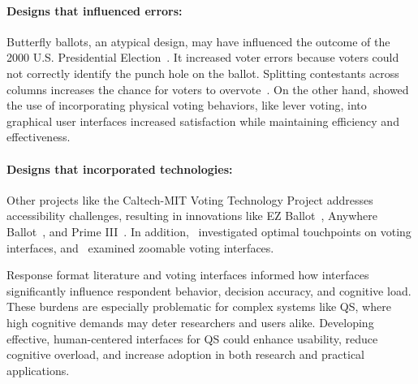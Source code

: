 \paragraph{Designs that influenced errors: } Butterfly ballots, an atypical design, may have influenced the outcome of the 2000 U.S. Presidential Election~\cite{wandButterflyDidIt2001}. It increased voter errors because voters could not correctly identify the punch hole on the ballot. Splitting contestants across columns increases the chance for voters to overvote~\cite{quesenberyOpinionGoodDesign2020}. On the other hand, \citet{everettElectronicVotingMachines2008} showed the use of incorporating physical voting behaviors, like lever voting, into graphical user interfaces increased satisfaction while maintaining efficiency and effectiveness.

\paragraph{Designs that incorporated technologies: } Other projects like the Caltech-MIT Voting Technology Project addresses accessibility challenges, resulting in innovations like EZ Ballot~\cite{leeUniversalDesignBallot2016}, Anywhere Ballot~\cite{summers2014making}, and Prime III~\cite{dawkinsPrimeIIIInnovative2009}. In addition,~\citet{gilbertAnomalyDetectionElectronic2013} investigated optimal touchpoints on voting interfaces, and~\citet{conradElectronicVotingEliminates2009} examined zoomable voting interfaces.

Response format literature and voting interfaces informed how interfaces significantly influence respondent behavior, decision accuracy, and cognitive load. These burdens are especially problematic for complex systems like QS, where high cognitive demands may deter researchers and users alike. Developing effective, human-centered interfaces for QS could enhance usability, reduce cognitive overload, and increase adoption in both research and practical applications.
